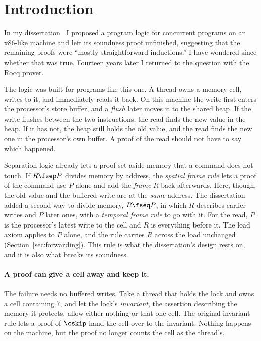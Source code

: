 \section{Introduction}
\label{sec:intro}

In my dissertation~\cite{wehrman12} I proposed a program logic for
concurrent programs on an x86-like machine and left its soundness proof
unfinished, suggesting that the remaining proofs were ``mostly
straightforward inductions.'' I have wondered since whether that was true.
Fourteen years later I returned to the question with the Rocq prover.

The logic was built for programs like this one. A thread owns a memory
cell, writes to it, and immediately reads it back. On this machine the
write first enters the processor's store buffer, and a \emph{flush} later
moves it to the shared heap. If the write flushes between the two
instructions, the read finds the new value in the heap. If it has not, the
heap still holds the old value, and the read finds the new one in the
processor's own buffer. A proof of the read should not have to say which
happened.

Separation logic already lets a proof set aside memory that a command does
not touch. If $R \fsep P$ divides memory by address, the \emph{spatial
frame rule} lets a proof of the command use $P$ alone and add the
\emph{frame} $R$ back afterwards. Here, though, the old value and the
buffered write are at the \emph{same} address. The dissertation added a
second way to divide memory, $R \fseq P$, in which $R$ describes earlier
writes and $P$ later ones, with a \emph{temporal frame rule} to go with it.
For the read, $P$ is the processor's latest write to the cell and $R$ is
everything before it. The load axiom applies to $P$ alone, and the rule
carries $R$ across the load unchanged (Section~\ref{sec:forwarding}).
This rule is what the dissertation's design rests on, and it is also what
breaks its soundness.

\paragraph{A proof can give a cell away and keep it.}
The failure needs no buffered writes. Take a thread that holds the lock and
owns a cell containing $7$, and let the lock's \emph{invariant}, the
assertion describing the memory it protects, allow either nothing or that
one cell. The original invariant rule lets a proof of $\cskip$ hand the cell
over to the invariant. Nothing happens on the machine, but the proof no
longer counts the cell as the thread's.

